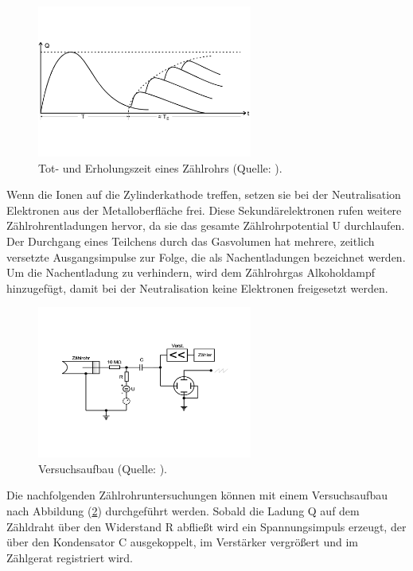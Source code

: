 \begin{figure}
            \centering
               \includegraphics[height=5cm]{totzeit.pdf}
               \caption{Tot- und Erholungszeit eines Zählrohrs (Quelle: \cite{V703}).}
               \label{fig:totzeit}
        \end{figure}

\noindent
Wenn die Ionen auf die Zylinderkathode treffen, setzen sie bei der Neutralisation Elektronen aus der Metalloberfläche frei.
Diese Sekundärelektronen rufen weitere Zählrohrentladungen hervor, da sie das gesamte Zählrohrpotential U durchlaufen.
Der Durchgang eines Teilchens durch das Gasvolumen hat mehrere, zeitlich versetzte Ausgangsimpulse zur Folge, die als Nachentladungen bezeichnet werden.
Um die Nachentladung zu verhindern, wird dem Zählrohrgas Alkoholdampf hinzugefügt, damit bei der Neutralisation keine Elektronen freigesetzt werden.   

\newpage
\begin{figure}
            \centering
               \includegraphics[height=5cm]{aufbau.pdf}
               \caption{Versuchsaufbau (Quelle: \cite{V703}).}
               \label{fig:aufbau}
        \end{figure}

\noindent
Die nachfolgenden Zählrohruntersuchungen können mit einem Versuchsaufbau nach Abbildung (\ref{fig:aufbau}) durchgeführt werden.
Sobald die Ladung Q auf dem Zähldraht über den Widerstand R abfließt wird ein Spannungsimpuls erzeugt, 
der über den Kondensator C ausgekoppelt, im Verstärker vergrößert und im Zählgerat registriert wird.

